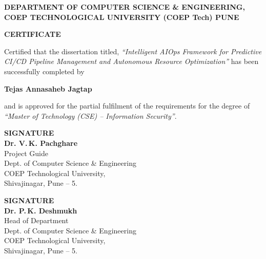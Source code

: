 \documentclass[12pt]{report}
\begin{document}
\begin{titlepage}
\thispagestyle{empty}

\linespread{1.3}
\begin{center}
    \Large{\bf{DEPARTMENT OF COMPUTER SCIENCE \& ENGINEERING,\\
	       COEP TECHNOLOGICAL UNIVERSITY (COEP Tech) PUNE\\}}
\end{center}

\vspace{1.2cm}

\begin{center}
    {\Large\bfseries CERTIFICATE}
\end{center}

\vspace{1.2cm}

\noindent
\large
Certified that the dissertation titled,
\textit{``Intelligent AIOps Framework for Predictive CI/CD
Pipeline Management and Autonomous Resource
Optimization''}
has been successfully completed by

\vspace{0.8cm}

\begin{center}
    {\Large\bfseries Tejas Annasaheb Jagtap }
\end{center}

\vspace{0.8cm}

\noindent
and is approved for the partial fulfilment of the requirements for the degree of
\textit{``Master of Technology (CSE) -- Information Security''}.

\vspace{2.2cm}

\begin{minipage}{0.45\textwidth}
    \textbf{SIGNATURE} \\[0.7em]
    \textbf{Dr. V.\,K. Pachghare} \\
    Project Guide \\[0.3em]
    Dept. of Computer Science \& Engineering \\[0.3em]
    COEP Technological University,\\
    Shivajinagar, Pune -- 5.
\end{minipage}
\hfill
\begin{minipage}{0.45\textwidth}
    \textbf{SIGNATURE} \\[0.7em]
    \textbf{Dr. P.\,K. Deshmukh} \\
    Head of Department \\[0.3em]
    Dept. of Computer Science \& Engineering \\[0.3em]
    COEP Technological University,\\
    Shivajinagar, Pune -- 5.
\end{minipage}

\end{titlepage}
\end{document}
